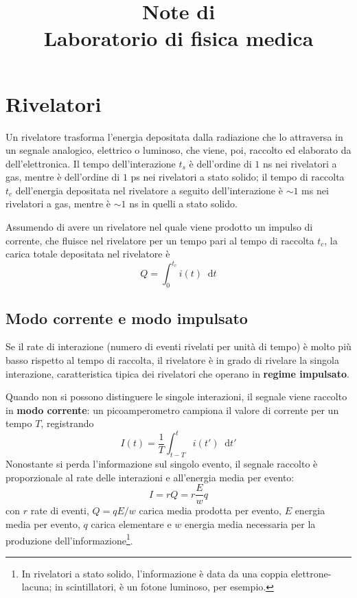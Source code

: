 \documentclass[11pt, a4paper]{scrartcl}
\title{Note di\\ \vspace{.15cm} Laboratorio di fisica medica}
\author{}
\date{}
\theoremstyle{style}
\renewcommand{\maketitle}{
\begin{center}
{\sffamily
{\fontsize{20}{20}\selectfont\MakeUppercase\thetitle}}

\vspace{0.2in}

{\large\scshape\sffamily\theauthor}
\end{center}
}
\newcommand{\dd}{\mathop{}\!\mathrm{d}}
\numberwithin{equation}{subsection}
\begin{document}
\maketitle
\newpage
\tableofcontents 
\newpage
\section{Rivelatori}

Un rivelatore trasforma l'energia depositata dalla radiazione che lo attraversa in un segnale analogico, elettrico o luminoso, che viene, poi, raccolto ed elaborato da dell'elettronica.
Il tempo dell'interazione $t_s$ \`e dell'ordine di $1$ ns nei rivelatori a gas, mentre \`e dell'ordine di $1$ ps nei rivelatori a stato solido; il tempo di raccolta $t_c$ dell'energia depositata nel rivelatore a seguito dell'interazione \`e $\sim 1$ ms nei rivelatori a gas, mentre \`e $\sim 1$ ns in quelli a stato solido.

Assumendo di avere un rivelatore nel quale viene prodotto un impulso di corrente, che fluisce nel rivelatore per un tempo pari al tempo di raccolta $t_c$, la carica totale depositata nel rivelatore \`e
\[
Q = \int _0^{t_c} i(t) \dd t
\] 
\subsection{Modo corrente e modo impulsato}


Se il rate di interazione (numero di eventi rivelati per unit\`a di tempo) \`e molto pi\`u basso rispetto al tempo di raccolta, il rivelatore \`e in grado di rivelare la singola interazione, caratteristica tipica dei rivelatori che operano in \textbf{regime impulsato}.

Quando non si possono distinguere le singole interazioni, il segnale viene raccolto in \textbf{modo corrente}: un picoamperometro campiona il valore di corrente per un tempo $T$, registrando
\[
I(t) = \frac{1}{T} \int_{t-T}^{t} i(t') \dd t'
\] 
Nonostante si perda l'informazione sul singolo evento, il segnale raccolto \`e proporzionale al rate delle interazioni e all'energia media per evento:
\[
I = rQ = r \frac{E}{w} q
\] 
con $r$ rate di eventi, $Q = q E / w$ carica media prodotta per evento, $E$ energia media per evento, $q$ carica elementare e $w$ energia media necessaria per la produzione dell'informazione\footnote{In rivelatori a stato solido, l'informazione \`e data da una coppia elettrone-lacuna; in scintillatori, \`e un fotone luminoso, per esempio.}.
\end{document}
